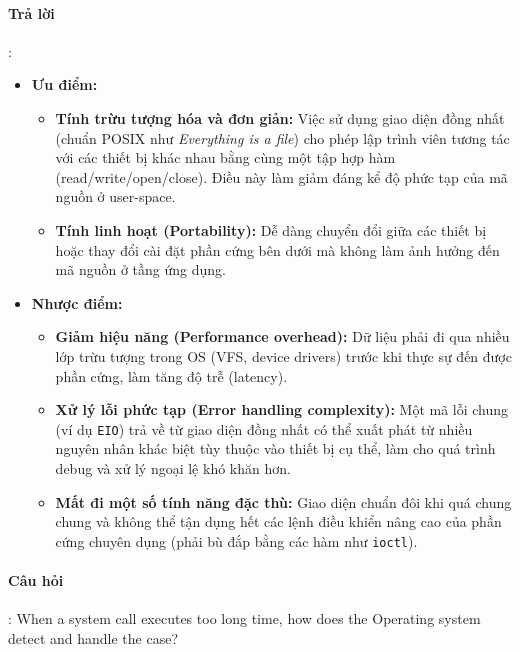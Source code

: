 \documentclass[a4paper]{article}
\begin{document}
\paragraph{Trả lời}:
\begin{itemize}
    \item \textbf{Ưu điểm:}
          \begin{itemize}
              \item \textbf{Tính trừu tượng hóa và đơn giản:} Việc sử dụng giao diện đồng nhất (chuẩn POSIX như \textit{Everything is a file}) cho phép lập trình viên tương tác với các thiết bị khác nhau bằng cùng một tập hợp hàm (read/write/open/close). Điều này làm giảm đáng kể độ phức tạp của mã nguồn ở user-space.
              \item \textbf{Tính linh hoạt (Portability):} Dễ dàng chuyển đổi giữa các thiết bị hoặc thay đổi cài đặt phần cứng bên dưới mà không làm ảnh hưởng đến mã nguồn ở tầng ứng dụng.
          \end{itemize}
    \item \textbf{Nhược điểm:}
          \begin{itemize}
              \item \textbf{Giảm hiệu năng (Performance overhead):} Dữ liệu phải đi qua nhiều lớp trừu tượng trong OS (VFS, device drivers) trước khi thực sự đến được phần cứng, làm tăng độ trễ (latency).
              \item \textbf{Xử lý lỗi phức tạp (Error handling complexity):} Một mã lỗi chung (ví dụ \texttt{EIO}) trả về từ giao diện đồng nhất có thể xuất phát từ nhiều nguyên nhân khác biệt tùy thuộc vào thiết bị cụ thể, làm cho quá trình debug và xử lý ngoại lệ khó khăn hơn.
              \item \textbf{Mất đi một số tính năng đặc thù:} Giao diện chuẩn đôi khi quá chung chung và không thể tận dụng hết các lệnh điều khiển nâng cao của phần cứng chuyên dụng (phải bù đắp bằng các hàm như \texttt{ioctl}).
          \end{itemize}
\end{itemize}

\paragraph{Câu hỏi}: When a system call executes too long time, how does the Operating system detect and handle the case?
\end{document}
